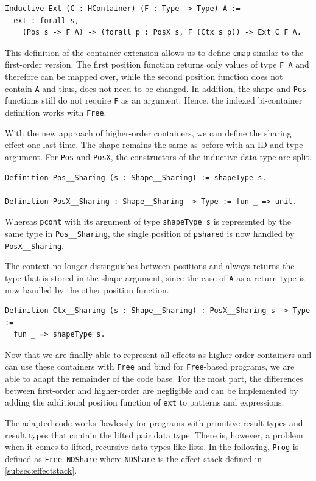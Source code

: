 \documentclass[a4paper, 11pt, fleqn, twoside, abstract=on]{scrreprt}
\newcommand{\cinl}[1]{\texttt{#1}}
\begin{document}
\begin{verbatim}
Inductive Ext (C : HContainer) (F : Type -> Type) A :=
  ext : forall s, 
    (Pos s -> F A) -> (forall p : PosX s, F (Ctx s p)) -> Ext C F A.
\end{verbatim}

This definition of the container extension allows us to define \cinl{cmap} similar to the first-order version.
The first position function returns only values of type \cinl{F A} and therefore can be mapped over, while the second position function does not contain \cinl{A} and thus, does not need to be changed.
In addition, the shape and \cinl{Pos} functions still do not require \cinl{F} as an argument.
Hence, the indexed bi-container definition works with \cinl{Free}.

With the new approach of higher-order containers, we can define the sharing effect one last time.
The shape remains the same as before with an ID and type argument.
For \cinl{Pos} and \cinl{PosX}, the constructors of the inductive data type are split.

\begin{verbatim}
Definition Pos__Sharing (s : Shape__Sharing) := shapeType s.

Definition PosX__Sharing : Shape__Sharing -> Type := fun _ => unit.
\end{verbatim}
\noindent
Whereas \cinl{pcont} with its argument of type \cinl{shapeType s} is represented by the same type in \cinl{Pos__Sharing}, the single position of \cinl{pshared} is now handled by \cinl{PosX__Sharing}.

The context no longer distinguishes between positions and always returns the type that is stored in the shape argument, since the case of \cinl{A} as a return type is now handled by the other position function.
\begin{verbatim}
Definition Ctx__Sharing (s : Shape__Sharing) : PosX__Sharing s -> Type :=
  fun _ => shapeType s.
\end{verbatim}

Now that we are finally able to represent all effects as higher-order containers and can use these containers with \cinl{Free} and bind for \cinl{Free}-based programs, we are able to adapt the remainder of the code base.
For the most part, the differences between first-order and higher-order are negligible and can be implemented by adding the additional position function of \cinl{ext} to patterns and expressions.

The adapted code works flawlessly for programs with primitive result types and result types that contain the lifted pair data type.
There is, however, a problem when it comes to lifted, recursive data types like lists.
In the following, \cinl{Prog} is defined as \cinl{Free NDShare} where \cinl{NDShare} is the effect stack defined in \autoref{subsec:effectstack}.
\end{document}
